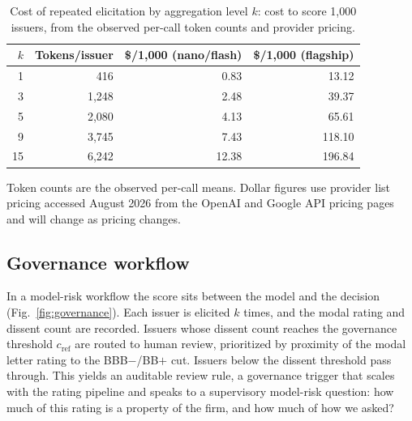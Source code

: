 \documentclass[a4paper,fleqn]{cas-sc}
\begin{document}
\begin{table}[t]\centering
\caption{Cost of repeated elicitation by aggregation level $k$: cost to score
1{,}000 issuers, from the observed per-call token counts and provider pricing.}\label{tab:cost}
\begin{tabular}{rrrr}\toprule
$k$ & Tokens/issuer & \$/1{,}000 (nano/flash) & \$/1{,}000 (flagship) \\\midrule
1 & 416 & 0.83 & 13.12 \\
3 & 1{,}248 & 2.48 & 39.37 \\
5 & 2{,}080 & 4.13 & 65.61 \\
9 & 3{,}745 & 7.43 & 118.10 \\
15 & 6{,}242 & 12.38 & 196.84 \\\bottomrule
\end{tabular}

\vspace{3pt}
{\footnotesize\raggedright Token counts are the observed per-call means. Dollar figures use provider list
pricing accessed August 2026 from the OpenAI and Google API pricing pages and will change as pricing
changes.\par}
\end{table}

\subsection{Governance workflow}\label{sec:sis-gov}
In a model-risk workflow the score sits between the model and the decision (Fig.~\ref{fig:governance}).
Each issuer is elicited $k$ times, and the modal rating and dissent count are recorded. Issuers
whose dissent count reaches the governance threshold $c_{\mathrm{ref}}$ are routed to human review,
prioritized by proximity of the modal letter rating to the BBB$-$/BB$+$ cut. Issuers below the
dissent threshold pass through. This yields an auditable review rule, a
governance trigger that scales with the rating pipeline and speaks to a supervisory model-risk question:
how much of this rating is a property of the firm, and how much of how we asked?
\end{document}
